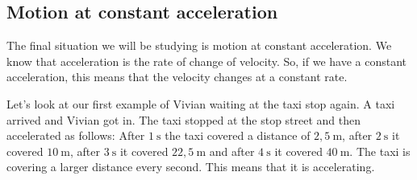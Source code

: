             \subsection*{Motion at constant acceleration}
            \nopagebreak
        \label{m38795*id71822}The final situation we will be studying is motion at constant acceleration. We know that acceleration is the rate of change of velocity. So, if we have a constant acceleration, this means that the velocity changes at a constant rate.\par 
        \label{m38795*id71827}Let's look at our first example of Vivian waiting at the taxi stop again. A taxi arrived and Vivian got in. The taxi stopped at the stop street and then accelerated as follows: After $1~\text{s}$ the taxi covered a distance of $2,5~\text{m}$, after $2~\text{s}$ it covered $10~\text{m}$, after $3~\text{s}$ it covered $22,5~\text{m}$ and after $4~\text{s}$ it covered $40~\text{m}$. The taxi is covering a larger distance every second. This means that it is accelerating.\par 
    \setcounter{subfigure}{0}
